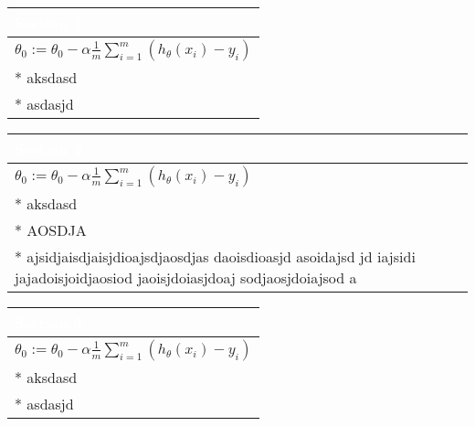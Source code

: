 \documentclass[a4paper,12pt,ngerman,fleqn]{article}
\newcommand{\mybox}[3]{
        \centering
        \begin{tabularx}{0.9\textwidth}{|X|}
            \hline
            \rowcolor{accent} 
            \textcolor{white}{\textbf{#1}} \\ \hline
            #2
            \\ \hline
            #3
            \\ \hline
        \end{tabularx}
    }
\begin{document}
    
    \setlength{\parindent}{0cm}


    \begin{minipage}[t]{.51\textwidth}
        \vspace{1pt}
        \mybox
            {Section 1}
            {\( \theta_0 := \theta_0 - \alpha \frac{1}{m} \sum\limits_{i=1}^{m}(h_\theta(x_{i}) - y_{i}) \)}
            {
                * aksdasd \\
                * asdasjd
            }
        \newline
        \newline
        \newline
        \mybox
            {Section 2}
            {\( \theta_0 := \theta_0 - \alpha \frac{1}{m} \sum\limits_{i=1}^{m}(h_\theta(x_{i}) - y_{i}) \)}
            {
                * aksdasd \\
                * AOSDJA \\
                * ajsidjaisdjaisjdioajsdjaosdjas daoisdioasjd asoidajsd jd iajsidi jajadoisjoidjaosiod jaoisjdoiasjdoaj sodjaosjdoiajsod a
            }
        \newline
        \newline
        \newline
        \mybox
            {Section 3}
            {\( \theta_0 := \theta_0 - \alpha \frac{1}{m} \sum\limits_{i=1}^{m}(h_\theta(x_{i}) - y_{i}) \)}
            {
                * aksdasd \\
                * asdasjd
            }
        \newline
    \end{minipage}%
\end{document}
